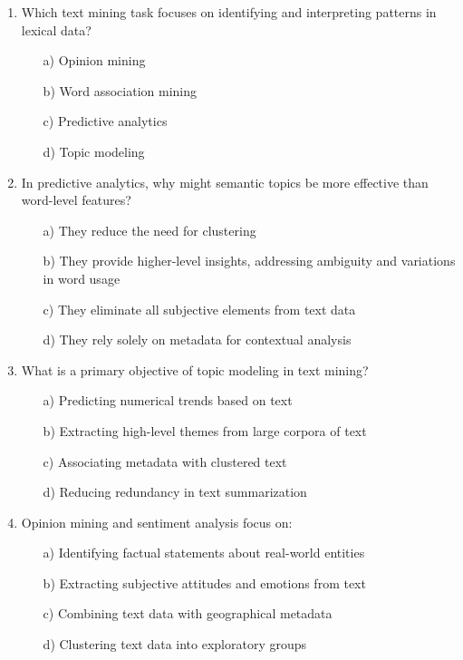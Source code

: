 \documentclass[8pt]{extarticle}
\begin{document}
\begin{multicols}{2}
\begin{enumerate}
\item Which text mining task focuses on identifying and interpreting patterns in lexical data?
\begin{itemize}
\item[a)] Opinion mining
\item[b)] Word association mining
\item[c)] Predictive analytics
\item[d)] Topic modeling
\end{itemize}

\item In predictive analytics, why might semantic topics be more effective than word-level features?
\begin{itemize}
\item[a)] They reduce the need for clustering
\item[b)] They provide higher-level insights, addressing ambiguity and variations in word usage
\item[c)] They eliminate all subjective elements from text data
\item[d)] They rely solely on metadata for contextual analysis
\end{itemize}


\item What is a primary objective of topic modeling in text mining?
\begin{itemize}
\item[a)] Predicting numerical trends based on text
\item[b)] Extracting high-level themes from large corpora of text
\item[c)] Associating metadata with clustered text
\item[d)] Reducing redundancy in text summarization
\end{itemize}

\item Opinion mining and sentiment analysis focus on:
\begin{itemize}
\item[a)] Identifying factual statements about real-world entities
\item[b)] Extracting subjective attitudes and emotions from text
\item[c)] Combining text data with geographical metadata
\item[d)] Clustering text data into exploratory groups
\end{itemize}


\end{enumerate}
\end{multicols}
\end{document}
